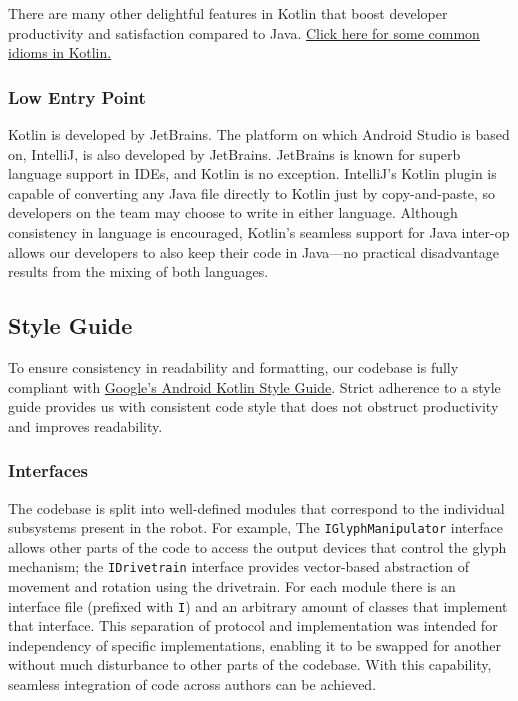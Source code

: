\documentclass[letterpaper]{article}
\begin{document}
There are many other delightful features in Kotlin that boost developer productivity and satisfaction compared to Java. \href{https://kotlinlang.org/docs/reference/idioms.html}{Click here for some common idioms in Kotlin.}

\subsubsection{Low Entry Point}

Kotlin is developed by JetBrains. The platform on which Android Studio is based on, IntelliJ, is also developed by JetBrains. JetBrains is known for superb language support in IDEs, and Kotlin is no exception. IntelliJ's Kotlin plugin is capable of converting any Java file directly to Kotlin just by copy-and-paste, so developers on the team may choose to write in either language. Although consistency in language is encouraged, Kotlin's seamless support for Java inter-op allows our developers to also keep their code in Java---no practical disadvantage results from the mixing of both languages.

\subsection{Style Guide}

To ensure consistency in readability and formatting, our codebase is fully compliant with \href{https://android.github.io/kotlin-guides/style.html}{Google's Android Kotlin Style Guide}. Strict adherence to a style guide provides us with consistent code style that does not obstruct productivity and improves readability.

\subsubsection{Interfaces}

The codebase is split into well-defined modules that correspond to the individual subsystems present in the robot. For example, The \texttt{IGlyphManipulator} interface allows other parts of the code to access the output devices that control the glyph mechanism; the \texttt{IDrivetrain} interface provides vector-based abstraction of movement and rotation using the drivetrain. For each module there is an interface file (prefixed with \texttt{I}) and an arbitrary amount of classes that implement that interface. This separation of protocol and implementation was intended for independency of specific implementations, enabling it to be swapped for another without much disturbance to other parts of the codebase. With this capability, seamless integration of code across authors can be achieved.
\end{document}
